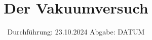 

\subject{Versuch 70}
\title{Der Vakuumversuch}
\date{%
  Durchführung: 23.10.2024
  \hspace{3em}
  Abgabe: DATUM
}



\maketitle
\thispagestyle{empty}
\tableofcontents
\newpage







\printbibliography{}


